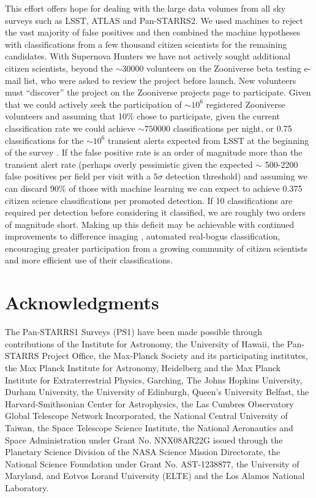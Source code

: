 \documentclass[a4paper,fleqn,usenatbib]{mnras}
\begin{document}
This effort offers hope for dealing with the large data volumes from all sky surveys such as LSST, ATLAS \citep{Tonry16} and Pan-STARRS2.  We used machines to reject the vast majority of false positives and then combined the machine hypotheses with classifications from a few thousand citizen scientists for the remaining candidates.  With Supernova Hunters we have not actively sought additional citizen scientists, beyond the $\sim30000$ volunteers on the Zooniverse beta testing e-mail list, who were asked to review the project before launch.  New volunteers must ``discover'' the project on the Zooniverse projects page to participate.  Given that we could actively seek the participation of $\sim 10^6$ registered Zooniverse volunteers and assuming that 10\% chose to participate, given the current classification rate we could achieve $\sim 750000$ classifications per night, or 0.75 classifications for the $\sim 10^6$ transient alerts expected from LSST at the beginning of the survey \citep{Ridgway14}.  If the false positive rate is an order of magnitude more than the transient alert rate (perhaps overly pessimistic given the expected $\sim$ 500-2200 false positives per field per visit \citep{Becker13} with a $5\sigma$ detection threshold) and assuming we can discard 90\% of those with machine learning we can expect to achieve 0.375 citizen science classifications per promoted detection.  If 10 classifications are required per detection before considering it classified, we are roughly two orders of magnitude short.  Making up this deficit may be achievable with continued improvements to difference imaging \citep{Zackay16}, automated real-bogus classification, encouraging greater participation from a growing community of citizen scientists and more efficient use of their classifications.

\section*{Acknowledgments}
The Pan-STARRS1 Surveys (PS1) have been made possible through contributions of the Institute for Astronomy, the University of Hawaii, the Pan-STARRS Project Office, the Max-Planck Society and its participating institutes, the Max Planck Institute for Astronomy, Heidelberg and the Max Planck Institute for Extraterrestrial Physics, Garching, The Johns Hopkins University, Durham University, the University of Edinburgh, Queen's University Belfast, the Harvard-Smithsonian Center for Astrophysics, the Las Cumbres Observatory Global Telescope Network Incorporated, the National Central University of Taiwan, the Space Telescope Science Institute, the National Aeronautics and Space Administration under Grant No. NNX08AR22G issued through the Planetary Science Division of the NASA Science Mission Directorate, the National Science Foundation under Grant No. AST-1238877, the University of Maryland, and Eotvos Lorand University (ELTE) and the Los Alamos National Laboratory.

 

\end{document}
